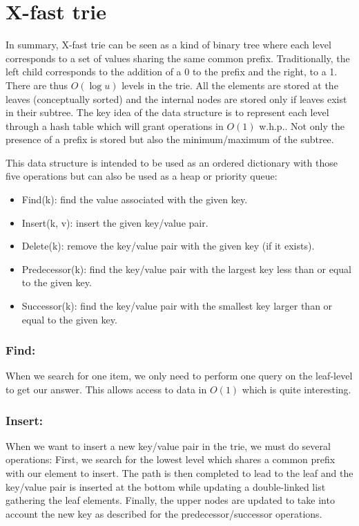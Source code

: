 
\section{X-fast trie}

In summary, X-fast trie can be seen as a kind of binary tree where each level corresponds to a set of values sharing the same common prefix. Traditionally, the left child corresponds to the addition of a 0 to the prefix and the right, to a 1. There are thus $O(\log u)$ levels in the trie. All the elements are stored at the leaves (conceptually sorted) and the internal nodes are stored only if leaves exist in their subtree. The key idea of the data structure is to represent each level through a hash table which will grant operations in $O(1)$ w.h.p.. Not only the presence of a prefix is stored but also the minimum/maximum of the subtree.

This data structure is intended to be used as an ordered dictionary with those five operations but can also be used as a heap or priority queue:

\begin{itemize}
    \item Find(k): find the value associated with the given key.
    \item Insert(k, v): insert the given key/value pair.
    \item Delete(k): remove the key/value pair with the given key (if it exists).
    \item Predecessor(k): find the key/value pair with the largest key less than or equal to the given key.
    \item Successor(k): find the key/value pair with the smallest key larger than or equal to the given key.
\end{itemize}

\subsubsection{Find:}
When we search for one item, we only need to perform one query on the leaf-level to get our answer. This allows access to data in $O(1)$ which is quite interesting.
\subsubsection{Insert:}
When we want to insert a new key/value pair in the trie, we must do several operations:
First, we search for the lowest level which shares a common prefix with our element to insert. The path is then completed to lead to the leaf and the key/value pair is inserted at the bottom while updating a double-linked list gathering the leaf elements. Finally, the upper nodes are updated to take into account the new key as described for the predecessor/successor operations.
